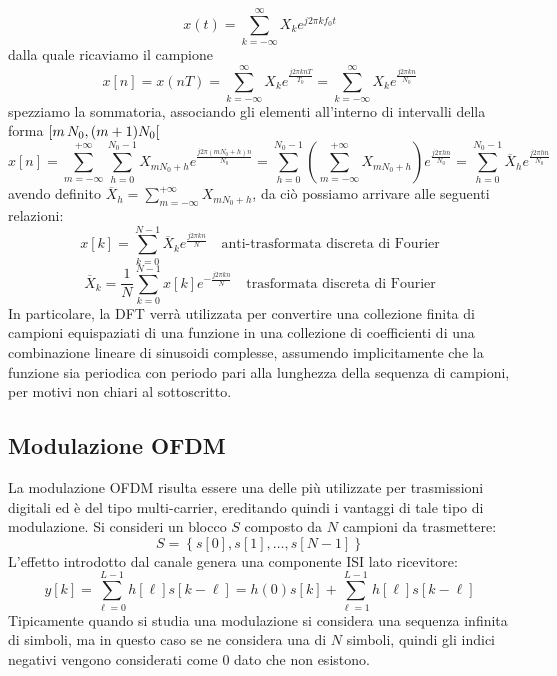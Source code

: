 \[
    x(t) = \sum_{k=-\infty}^{\infty} X_k e^{j2\pi k f_0 t}
\]
dalla quale ricaviamo il campione
\[
    x[n] = x(nT) = \sum_{k=-\infty}^{\infty} X_k e^{\frac{j2\pi k nT}{T_0}} = \sum_{k=-\infty}^{\infty} X_k e^{\frac{j2\pi k n}{N_0}}
\]
spezziamo la sommatoria, associando gli elementi all'interno di intervalli della forma $\rinterval{m\, N_0}{(m+1) N_0}$
\[
    x[n] = \sum_{m=-\infty}^{+\infty} \sum_{h=0}^{N_0-1} X_{mN_0 + h} e^{\frac{j2\pi (mN_0 + h) n}{N_0}} = \sum_{h=0}^{N_0-1} \left( \sum_{m=-\infty}^{+\infty} X_{mN_0 + h}\right) e^{\frac{j2\pi h n}{N_0}} = \sum_{h=0}^{N_0-1} \overline{X}_h e^{\frac{j2\pi h n}{N_0}} 
\]
avendo definito $\overline{X}_h = \sum_{m=-\infty}^{+\infty} X_{mN_0 + h}$, da ciò possiamo arrivare alle seguenti relazioni:
\[
    x[k] = \sum_{k=0}^{N-1} \overline{X}_k e^{\frac{j2\pi kn}{N}} \quad \text{anti-trasformata discreta di Fourier}
\]
\[
    \overline{X}_k = \frac{1}{N} \sum_{k=0}^{N-1} x[k] e^{-\frac{j2\pi kn}{N}} \quad \text{trasformata discreta di Fourier}
\]
In particolare, la DFT verrà utilizzata per convertire una collezione finita di campioni equispaziati di una funzione in una collezione di coefficienti di una combinazione lineare di sinusoidi complesse,
assumendo implicitamente che la funzione sia periodica con periodo pari alla lunghezza della sequenza di campioni, per motivi non chiari al sottoscritto.
\subsection*{Modulazione OFDM}
La modulazione OFDM risulta essere una delle più utilizzate per trasmissioni digitali ed è del tipo multi-carrier, ereditando quindi i vantaggi di tale tipo di modulazione.
Si consideri un blocco $S$ composto da $N$ campioni da trasmettere:
\[
  S = \left\{s\left[0\right], s\left[1\right], \ldots, s\left[N-1\right]\right\}
\]
L'effetto introdotto dal canale genera una componente ISI lato ricevitore:
\[
  y\left[k\right] = \sum_{\ell=0}^{L-1} h\left[\ell\right] s\left[k - \ell\right] = h(0)s\left[k\right] + \sum_{\ell=1}^{L-1} h\left[\ell\right] s\left[k - \ell\right]
\]
Tipicamente quando si studia una modulazione si considera una sequenza infinita di simboli, ma in questo caso se ne considera una di $N$ simboli, quindi gli indici negativi vengono considerati come 0 dato che non esistono.


